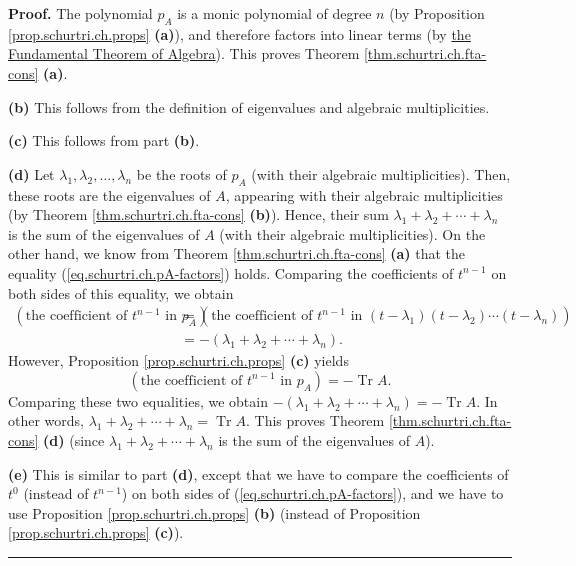 \documentclass[numbers=enddot,12pt,final,onecolumn,notitlepage]{scrartcl}%
\numberwithin{exer}{subsection}
\theoremstyle{definition}
\newenvironment{proof}[1][Proof]{\noindent\textbf{#1.} }{\ \rule{0.5em}{0.5em}}
\begin{document}
\begin{proof}
The polynomial $p_{A}$ is a monic polynomial of degree $n$ (by Proposition
\ref{prop.schurtri.ch.props} \textbf{(a)}), and therefore factors into linear
terms (by
\href{https://en.wikipedia.org/wiki/Fundamental_theorem_of_algebra}{the
Fundamental Theorem of Algebra}). This proves Theorem
\ref{thm.schurtri.ch.fta-cons} \textbf{(a)}. \medskip

\textbf{(b)} This follows from the definition of eigenvalues and algebraic
multiplicities. \medskip

\textbf{(c)} This follows from part \textbf{(b)}. \medskip

\textbf{(d)} Let $\lambda_{1},\lambda_{2},\ldots,\lambda_{n}$ be the roots of
$p_{A}$ (with their algebraic multiplicities). Then, these roots are the
eigenvalues of $A$, appearing with their algebraic multiplicities (by Theorem
\ref{thm.schurtri.ch.fta-cons} \textbf{(b)}). Hence, their sum $\lambda
_{1}+\lambda_{2}+\cdots+\lambda_{n}$ is the sum of the eigenvalues of $A$
(with their algebraic multiplicities). On the other hand, we know from Theorem
\ref{thm.schurtri.ch.fta-cons} \textbf{(a)} that the equality
(\ref{eq.schurtri.ch.pA-factors}) holds. Comparing the coefficients of
$t^{n-1}$ on both sides of this equality, we obtain%
\begin{align*}
\left(  \text{the coefficient of }t^{n-1}\text{ in }p_{A}\right)    & =\left(
\text{the coefficient of }t^{n-1}\text{ in }\left(  t-\lambda_{1}\right)
\left(  t-\lambda_{2}\right)  \cdots\left(  t-\lambda_{n}\right)  \right)  \\
& =-\left(  \lambda_{1}+\lambda_{2}+\cdots+\lambda_{n}\right)  .
\end{align*}
However, Proposition \ref{prop.schurtri.ch.props} \textbf{(c)} yields
\[
\left(  \text{the coefficient of }t^{n-1}\text{ in }p_{A}\right)
=-\operatorname*{Tr}A.
\]
Comparing these two equalities, we obtain $-\left(  \lambda_{1}+\lambda
_{2}+\cdots+\lambda_{n}\right)  =-\operatorname*{Tr}A$. In other words,
$\lambda_{1}+\lambda_{2}+\cdots+\lambda_{n}=\operatorname*{Tr}A$. This proves
Theorem \ref{thm.schurtri.ch.fta-cons} \textbf{(d)} (since $\lambda
_{1}+\lambda_{2}+\cdots+\lambda_{n}$ is the sum of the eigenvalues of $A$). \medskip

\textbf{(e)} This is similar to part \textbf{(d)}, except that we have to
compare the coefficients of $t^{0}$ (instead of $t^{n-1}$) on both sides of
(\ref{eq.schurtri.ch.pA-factors}), and we have to use Proposition
\ref{prop.schurtri.ch.props} \textbf{(b)} (instead of Proposition
\ref{prop.schurtri.ch.props} \textbf{(c)}).
\end{proof}
\end{document}

